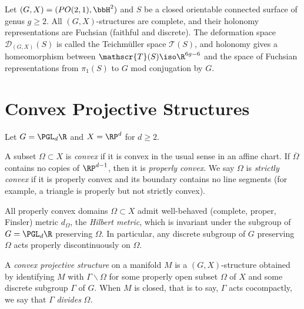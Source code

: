 \documentclass{article}
\begin{document}
\begin{example}
	Let $(G,X) = (PO(2,1), \bbH^2)$ and $S$ be a closed orientable connected surface of genus $g \geq 2$. All $(G,X)$-structures are complete, and their holonomy representations are Fuchsian (faithful and discrete). The deformation space $\mathscr{D}_{(G,X)}(S)$ is called the Teichm\"uller space $\mathscr{T}(S)$, and holonomy gives a homeomorphism between $\mathscr{T}(S) \iso \R^{6g - 6}$ and the space of Fuchsian representations from $\pi_1(S)$ to $G$ mod conjugation by $G$.
\end{example}

\section{Convex Projective Structures}
Let $G = \PGL_d\R$ and $X = \RP^d$ for $d \geq 2$.
\begin{definition}
	A subset $\Omega \subset X$ is \textit{convex} if it is convex in the usual sense in an affine chart. If $\overline{\Omega}$ contains no copies of $\RP^{d - 1}$, then it is \textit{properly convex}. We say $\Omega$ is \textit{strictly convex} if it is properly convex and its boundary contains no line segments (for example, a triangle is properly but not strictly convex). 
\end{definition}

All properly convex domains $\Omega \subset X$ admit well-behaved (complete, proper, Finsler) metric $d_{\Omega}$, the \textit{Hilbert metric}, which is invariant under the subgroup of $G = \PGL_d\R$ preserving $\Omega$. In particular, any discrete subgroup of $G$ preserving $\Omega$ acts properly discontinuously on $\Omega$.

\begin{definition}
	A \textit{convex projective structure} on a manifold $M$ is a $(G,X)$-structure obtained by identifying $M$ with $\Gamma\backslash \Omega$ for some properly open subset $\Omega$ of $X$ and some discrete subgroup $\Gamma$ of $G$. When $M$ is closed, that is to say, $\Gamma$ acts cocompactly, we say that $\Gamma$ \textit{divides} $\Omega$.  
\end{definition}
\end{document}
